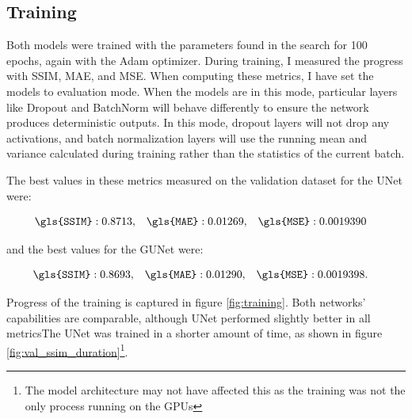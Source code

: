 \subsection{Training}
\label{subsec:training}

Both models were trained with the parameters found in the search for 100 epochs, again with the Adam optimizer. During training, I measured the progress with \gls{SSIM}, \gls{MAE}, and \gls{MSE}. When computing these metrics, I have set the models to evaluation mode. When the models are in this mode, particular layers like Dropout and BatchNorm will behave differently to ensure the network produces deterministic outputs. In this mode, dropout layers will not drop any activations, and batch normalization layers will use the running mean and variance calculated during training rather than the statistics of the current batch.

The best values in these metrics measured on the validation dataset for the UNet were:

\begin{align*}
    &\texttt{\gls{SSIM}}: 0.8713, & &\texttt{\gls{MAE}}: 0.01269, & &\texttt{\gls{MSE}}: 0.0019390
\end{align*}

\noindent and the best values for the GUNet were:

\begin{align*}
    &\texttt{\gls{SSIM}}: 0.8693, & &\texttt{\gls{MAE}}: 0.01290, & &\texttt{\gls{MSE}}:0.0019398.
\end{align*}

Progress of the training is captured in figure \ref{fig:training}. Both networks' capabilities are comparable, although UNet performed slightly better in all metricsThe UNet was trained in a shorter amount of time, as shown in figure \ref{fig:val_ssim_duration}\footnote{The model architecture may not have affected this as the training was not the only process running on the GPUs}.


